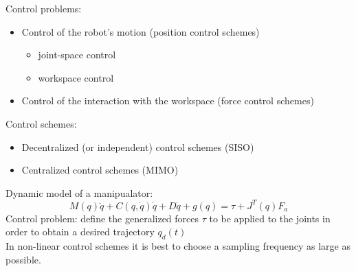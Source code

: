 \documentclass{book}
\begin{document}
Control problems:
\begin{itemize}
    \item Control of the robot's motion (position control schemes)
        \begin{itemize}
            \item joint-space control
            \item workspace control
        \end{itemize}
    \item Control of the interaction with the workspace (force control schemes)
\end{itemize}
Control schemes: 
\begin{itemize}
    \item Decentralized (or independent) control schemes (SISO)
    \item Centralized control schemes (MIMO)
\end{itemize}
Dynamic model of a manipualator:
\[
    M(q)\ddot{q}+C(q,\dot{q})\dot{q}+D\dot{q}+g(q) = \tau + J^T(q)F_a
\]
Control problem: define the generalized forces $\tau$ to be applied to the joints in order to obtain a desired trajectory $q_d(t)$\\
In non-linear control schemes it is best to choose a sampling frequency as large as possible.
\end{document}
